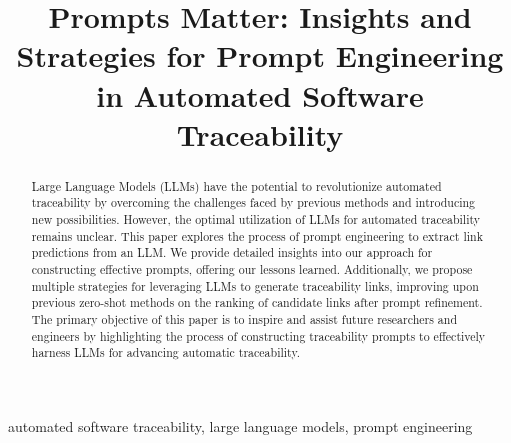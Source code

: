 \documentclass[conference]{IEEEtran}
\begin{document}
\title{Prompts Matter: Insights and Strategies for Prompt Engineering in Automated Software Traceability
}

\author{
  \and
  \and
}
\maketitle

\begin{abstract}
Large Language Models (LLMs) have the potential to revolutionize automated traceability by overcoming the challenges faced by previous methods and introducing new possibilities. However, the optimal utilization of LLMs for automated traceability remains unclear. This paper explores the process of prompt engineering to extract link predictions from an LLM. We provide detailed insights into our approach for constructing effective prompts, offering our lessons learned. Additionally, we propose multiple strategies for leveraging LLMs to generate traceability links, improving upon previous zero-shot methods on the ranking of candidate links after prompt refinement. The primary objective of this paper is to inspire and assist future researchers and engineers by highlighting the process of constructing traceability prompts to effectively harness LLMs for advancing automatic traceability.
\end{abstract}

\begin{IEEEkeywords}
  automated software traceability, large language models, prompt engineering
\end{IEEEkeywords}
\end{document}
